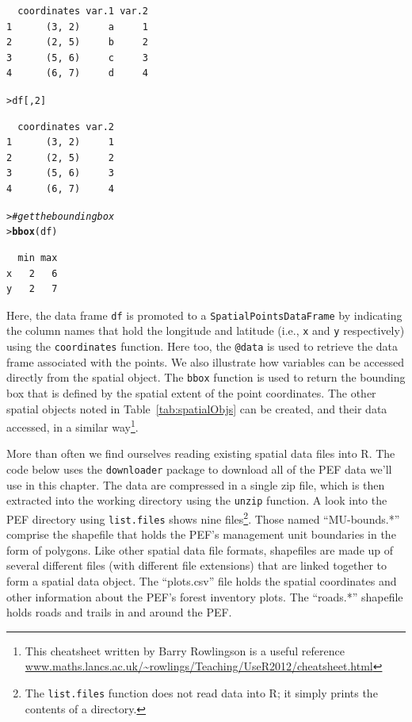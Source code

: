 \documentclass[12pt,oneside]{book}\usepackage[]{graphicx}\usepackage[]{color}
\makeatletter
\newcommand{\hlnum}[1]{\textcolor[rgb]{0.686,0.059,0.569}{#1}}%
\newcommand{\hlcom}[1]{\textcolor[rgb]{0.678,0.584,0.686}{\textit{#1}}}%
\newcommand{\hlstd}[1]{\textcolor[rgb]{0.345,0.345,0.345}{#1}}%
\newcommand{\hlkwd}[1]{\textcolor[rgb]{0.737,0.353,0.396}{\textbf{#1}}}%
\newenvironment{kframe}{%
 \def\at@end@of@kframe{}%
 \ifinner\ifhmode%
  \def\at@end@of@kframe{\end{minipage}}%
  \begin{minipage}{\columnwidth}%
 \fi\fi%
 \def\FrameCommand##1{\hskip\@totalleftmargin \hskip-\fboxsep
 \colorbox{shadecolor}{##1}\hskip-\fboxsep
     \hskip-\linewidth \hskip-\@totalleftmargin \hskip\columnwidth}%
 \MakeFramed {\advance\hsize-\width
   \@totalleftmargin\z@ \linewidth\hsize
   \@setminipage}}%
 {\par\unskip\endMakeFramed%
 \at@end@of@kframe}
\newenvironment{knitrout}{}{} %
\makeatother
\begin{document}
\begin{knitrout}
\begin{kframe}
\begin{verbatim}
  coordinates var.1 var.2
1      (3, 2)     a     1
2      (2, 5)     b     2
3      (5, 6)     c     3
4      (6, 7)     d     4
\end{verbatim}
\begin{alltt}
\hlstd{> }\hlstd{df[,} \hlnum{2}\hlstd{]}
\end{alltt}
\begin{verbatim}
  coordinates var.2
1      (3, 2)     1
2      (2, 5)     2
3      (5, 6)     3
4      (6, 7)     4
\end{verbatim}
\begin{alltt}
\hlstd{> }\hlcom{# get the bounding box}
\hlstd{> }\hlkwd{bbox}\hlstd{(df)}
\end{alltt}
\begin{verbatim}
  min max
x   2   6
y   2   7
\end{verbatim}
\end{kframe}
\end{knitrout}

Here, the data frame \verb+df+ is promoted to a \verb+SpatialPointsDataFrame+ by indicating the column names that hold the longitude and latitude (i.e., \verb+x+ and \verb+y+ respectively) using the \verb+coordinates+ function. Here too, the \verb+@data+ is used to retrieve the data frame associated with the points. We also illustrate how variables can be accessed directly from the spatial object. The \verb+bbox+ function is used to return the bounding box that is defined by the spatial extent of the point coordinates. The other spatial objects noted in Table~\ref{tab:spatialObjs} can be created, and their data accessed, in a similar way\footnote{This cheatsheet written by Barry Rowlingson is a useful reference \url{www.maths.lancs.ac.uk/~rowlings/Teaching/UseR2012/cheatsheet.html}}. 

More than often we find ourselves reading existing spatial data files into R. The code below uses the \verb+downloader+ package to download all of the PEF data we'll use in this chapter. The data are compressed in a single zip file, which is then extracted into the working directory using the \verb+unzip+ function. A look into the PEF directory using \verb+list.files+ shows nine files\footnote{The \texttt{list.files} function does not read data into R; it simply prints the contents of a directory.}. Those named ``MU-bounds.*'' comprise the shapefile that holds the PEF's management unit boundaries in the form of polygons. Like other spatial data file formats, shapefiles are made up of several different files (with different file extensions) that are linked together to form a spatial data object. The ``plots.csv'' file holds the spatial coordinates and other information about the PEF's forest inventory plots. The ``roads.*'' shapefile holds roads and trails in and around the PEF.
\end{document}

